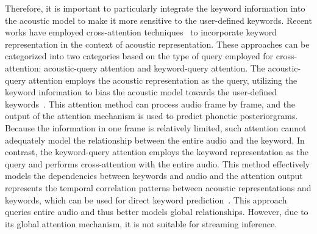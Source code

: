 \documentclass{article}
\begin{document}
Therefore, it is important to particularly integrate the keyword information into the acoustic model to make it more sensitive to the user-defined keywords. Recent works have employed cross-attention techniques~\cite{attention} to incorporate keyword representation in the context of acoustic representation. These approaches can be categorized into two categories based on the type of query employed for cross-attention: acoustic-query attention and keyword-query attention.
The acoustic-query attention employs the acoustic representation as the query, utilizing the keyword information to bias the acoustic model towards the user-defined keywords~\cite{he2017streaming,liu2021rnn,tian2021improving,sjbias}. This attention method can process audio frame by frame, and the output of the attention mechanism is used to predict phonetic posteriorgrams. Because the information in one frame is relatively limited, such attention cannot adequately model the relationship between the entire audio and the keyword.
In contrast, the keyword-query attention employs the keyword representation as the query and performs cross-attention with the entire audio. This method effectively models the dependencies between keywords and audio and the attention output represents the temporal correlation patterns between acoustic representations and keywords, which can be used for direct keyword prediction~\cite{e2e2,e2e, agree, dynamic}. This approach queries entire audio and thus better models global relationships. However, due to its global attention mechanism, it is not suitable for streaming inference.


\end{document}

